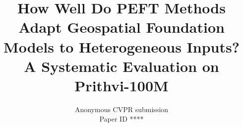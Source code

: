 \documentclass[10pt,twocolumn,letterpaper]{article}
\def\cvprPaperID{****}
\begin{document}
\title{How Well Do PEFT Methods Adapt Geospatial Foundation Models to Heterogeneous Inputs? A Systematic Evaluation on Prithvi-100M}

\author{Anonymous CVPR submission\\
Paper ID \cvprPaperID}

\maketitle










{\small


}


\end{document}
